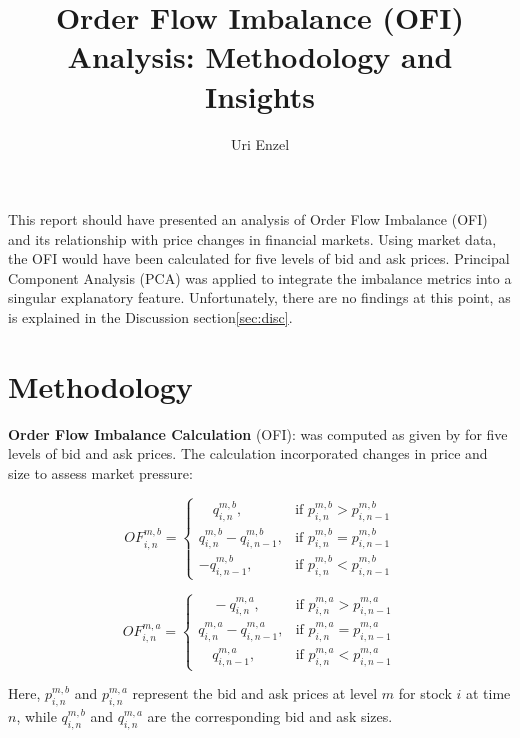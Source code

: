 \documentclass[12pt]{article}
\title{Order Flow Imbalance (OFI) Analysis: Methodology and Insights}
\author{Uri Enzel}
\begin{document}
\maketitle

\begin{center}
  \begin{minipage}{0.8\textwidth}
    \small
    This report should have presented an analysis of Order Flow Imbalance (OFI) and its relationship with price changes in financial markets. Using market data, the OFI would have been calculated for five levels of bid and ask prices. Principal Component Analysis (PCA) was applied to integrate the imbalance metrics into a singular explanatory feature. Unfortunately, there are no findings at this point, as is explained in the Discussion section\ref{sec:disc}.
  \end{minipage}
\end{center}

\vspace{0.5cm}

\section*{Methodology}
\textbf{Order Flow Imbalance Calculation} (OFI): was computed as given by \textcite{Cont2023CrossImpact} for five levels of bid and ask prices. The calculation incorporated changes in price and size to assess market pressure:

\[
OF_{i,n}^{m,b} = \begin{cases} 
   \quad q_{i,n}^{m,b}, & \text{if } p_{i,n}^{m,b} > p_{i,n-1}^{m,b} \\
    q_{i,n}^{m,b} - q_{i,n-1}^{m,b}, & \text{if } p_{i,n}^{m,b} = p_{i,n-1}^{m,b} \\
    -q_{i,n-1}^{m,b}, & \text{if } p_{i,n}^{m,b} < p_{i,n-1}^{m,b}
\end{cases}
\]

\[
OF_{i,n}^{m,a} = \begin{cases} 
   \quad -q_{i,n}^{m,a}, & \text{if } p_{i,n}^{m,a} > p_{i,n-1}^{m,a} \\
    q_{i,n}^{m,a} - q_{i,n-1}^{m,a}, & \text{if } p_{i,n}^{m,a} = p_{i,n-1}^{m,a} \\
    \quad q_{i,n-1}^{m,a}, & \text{if } p_{i,n}^{m,a} < p_{i,n-1}^{m,a}
\end{cases}
\]

Here, $p_{i,n}^{m,b}$ and $p_{i,n}^{m,a}$ represent the bid and ask prices at level $m$ for stock $i$ at time $n$, while $q_{i,n}^{m,b}$ and $q_{i,n}^{m,a}$ are the corresponding bid and ask sizes.
\end{document}
